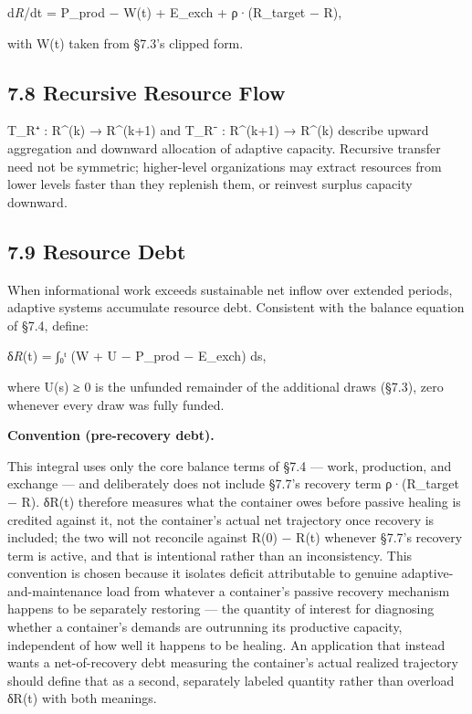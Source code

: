 \documentclass[
]{article}
\begin{document}
d\emph{R}/dt = P\_prod − W(t) + E\_exch + ρ·(R\_target − R),

with W(t) taken from §7.3's clipped form.

\hypertarget{recursive-resource-flow}{%
\subsection{7.8 Recursive Resource Flow}\label{recursive-resource-flow}}

T\_R⁺ : R\^{}(k) → R\^{}(k+1) and T\_R⁻ : R\^{}(k+1) → R\^{}(k) describe
upward aggregation and downward allocation of adaptive capacity.
Recursive transfer need not be symmetric; higher-level organizations may
extract resources from lower levels faster than they replenish them, or
reinvest surplus capacity downward.

\hypertarget{resource-debt}{%
\subsection{7.9 Resource Debt}\label{resource-debt}}

When informational work exceeds sustainable net inflow over extended
periods, adaptive systems accumulate resource debt. Consistent with the
balance equation of §7.4, define:

δ\emph{R}(t) = ∫₀ᵗ (W + U − P\_prod − E\_exch) ds,

where U(s) ≥ 0 is the unfunded remainder of the additional draws (§7.3),
zero whenever every draw was fully funded.

\textbf{Convention (pre-recovery debt).}

This integral uses only the core balance terms of §7.4 --- work,
production, and exchange --- and deliberately does not include §7.7's
recovery term ρ·(R\_target − R). δR(t) therefore measures what the
container owes before passive healing is credited against it, not the
container's actual net trajectory once recovery is included; the two
will not reconcile against R(0) − R(t) whenever §7.7's recovery term is
active, and that is intentional rather than an inconsistency. This
convention is chosen because it isolates deficit attributable to genuine
adaptive-and-maintenance load from whatever a container's passive
recovery mechanism happens to be separately restoring --- the quantity
of interest for diagnosing whether a container's demands are outrunning
its productive capacity, independent of how well it happens to be
healing. An application that instead wants a net-of-recovery debt
measuring the container's actual realized trajectory should define that
as a second, separately labeled quantity rather than overload δR(t) with
both meanings.
\end{document}
